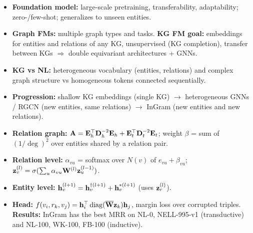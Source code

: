 \bigskip{}
{}
\begin{summarybox}
  \begin{itemize}
    \item \textbf{Foundation model:} large-scale pretraining, transferability,
      adaptability; zero-/few-shot; generalizes to unseen entities.
    \item \textbf{Graph FMs:} multiple graph types and tasks. \textbf{KG FM goal:}
      embeddings for entities and relations of any KG, unsupervised (KG completion),
      transfer between KGs $\Rightarrow$ double equivariant architectures + GNNs.
    \item \textbf{KG vs NL:} heterogeneous vocabulary (entities, relations) and complex
      graph structure vs homogeneous tokens connected sequentially.
    \item \textbf{Progression:} shallow KG embeddings (single KG) $\to$ heterogeneous
      GNNs / RGCN (new entities, same relations) $\to$ InGram (new entities and new
      relations).
    \item \textbf{Relation graph:} $\mathbf{A}=\mathbf{E}_h^{\top}\mathbf{D}_h^{-2}\mathbf{E}_h+\mathbf{E}_t^{\top}\mathbf{D}_t^{-2}\mathbf{E}_t$;
      weight $\beta$ = sum of $(1/\deg)^2$ over entities shared by a relation pair.
    \item \textbf{Relation level:} $\alpha_{vu}$ = softmax over $N(v)$ of
      $e_{vu}+\beta_{vu}$; $\mathbf{z}_v^{(l)}=\sigma(\sum_{u}\alpha_{vu}\mathbf{W}^{(l)}\mathbf{z}_u^{(l-1)})$.
    \item \textbf{Entity level:} $\mathbf{h}_v^{(l+1)}=\mathbf{h}_v^{\dagger(l+1)}+\mathbf{h}_v^{\ast(l+1)}$
      (uses $\mathbf{z}_r^{(l)}$).
    \item \textbf{Head:} $f(v_i,r_k,v_j)=\mathbf{h}_i^{\top}\operatorname{diag}(\overline{\mathbf{W}}\mathbf{z}_k)\mathbf{h}_j$, margin
      loss over corrupted triples. \textbf{Results:} InGram has the best MRR on NL-0,
      NELL-995-v1 (transductive) and NL-100, WK-100, FB-100 (inductive).
  \end{itemize}
\end{summarybox}
